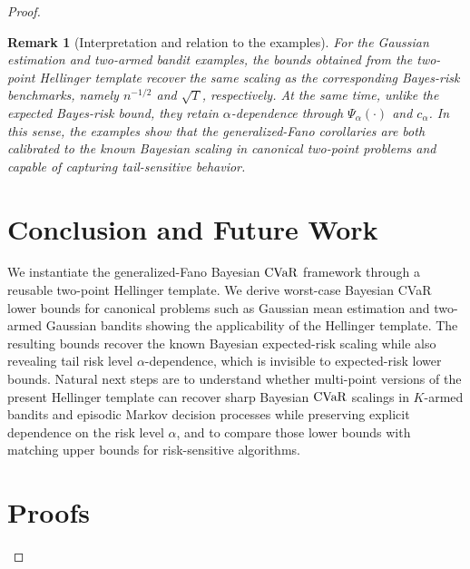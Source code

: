 \documentclass[conference]{IEEEtran}
\newtheorem{remark}{Remark}
\begin{document}
\begin{proof}[Proof]
\begin{remark}[Interpretation and relation to the examples]
For the Gaussian estimation and two-armed bandit examples, the bounds obtained from the two-point Hellinger template recover the same scaling as the corresponding Bayes-risk benchmarks, namely \(n^{-1/2}\) and \(\sqrt{T}\), respectively. At the same time, unlike the expected Bayes-risk bound, they retain \(\alpha\)-dependence through \(\Psi_\alpha(\cdot)\) and \(c_\alpha\). In this sense, the examples show that the generalized-Fano corollaries are both calibrated to the known Bayesian scaling in canonical two-point problems and capable of capturing tail-sensitive behavior.
\end{remark}

\section{Conclusion and Future Work}

We instantiate the generalized-Fano Bayesian \(\textup{CVaR}\) framework through a reusable two-point Hellinger template. We derive worst-case Bayesian CVaR lower bounds for canonical problems such as Gaussian mean estimation and two-armed Gaussian bandits showing the applicability of the Hellinger template. The resulting bounds recover the known Bayesian expected-risk scaling while also revealing tail risk level \(\alpha\)-dependence, which is invisible to expected-risk lower bounds. Natural next steps are to understand whether multi-point versions of the present Hellinger template can recover sharp Bayesian \(\textup{CVaR}\) scalings in \(K\)-armed bandits and episodic Markov decision processes while preserving explicit dependence on the risk level \(\alpha\), and to compare those lower bounds with matching upper bounds for risk-sensitive algorithms.

\IEEEpeerreviewmaketitle



\newpage
\appendix
\section{Proofs}
\label{app:proofs}


\end{proof}
\end{document}
